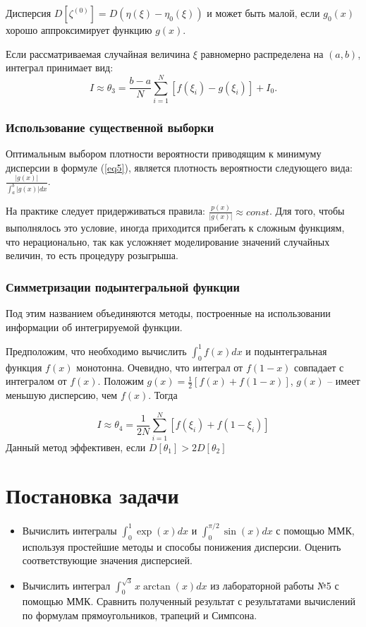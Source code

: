 \documentclass[
11pt,
master, %
subf, %
href, %
colorlinks=true, %
times, %
]{disser}
\begin{document}
Дисперсия $D\left[\zeta^{(0)}\right] = D(\eta(\xi)-\eta_0(\xi))$ и может быть малой, если $g_0(x)$ хорошо аппроксимирует функцию $g(x)$.

Если рассматриваемая случайная величина $\xi$ равномерно распределена на $(a,b)$, интеграл принимает вид:
\begin{equation}\label{eq14}
  I\approx \theta_3 = \frac{b-a}{N}\sum_{i=1}^{N}[f(\xi_i)-g(\xi_i)] + I_0.
\end{equation}

\subsubsection{Использование существенной выборки}
Оптимальным выбором плотности вероятности приводящим к минимуму дисперсии в формуле (\ref{eq5}), является плотность вероятности следующего вида: $\frac{|g(x)|}{\int_{a}^{b}|g(x)|dx}$.

На практике следует придерживаться правила: $\frac{p(x)}{|g(x)|} \approx const$. Для того, чтобы выполнялось это условие, иногда приходится прибегать к сложным функциям, что нерационально, так как усложняет моделирование значений случайных величин, то есть процедуру розыгрыша.

\subsubsection{Симметризации подынтегральной функции}
Под этим названием объединяются методы, построенные на использовании информации об интегрируемой функции.

Предположим, что необходимо вычислить $\int_{0}^{1}f(x)dx$ и подынтегральная функция $f(x)$ монотонна. Очевидно, что интеграл от $f(1-x)$ совпадает с интегралом от $f(x)$. Положим $g(x) = \frac{1}{2}[f(x) + f(1-x)]$, $g(x)$ -- имеет меньшую дисперсию, чем $f(x)$. Тогда

\begin{equation}\label{eq15}
  I\approx \theta_4 = \frac{1}{2N}\sum_{i=1}^{N}[f(\xi_i)+f(1-\xi_i)]
\end{equation}
Данный метод эффективен, если $D[\theta_1] > 2D[\theta_2]$

\newpage
\section{Постановка задачи}
\begin{itemize}
  \item Вычислить интегралы $\displaystyle\int_{0}^{1}\exp(x)dx$ и $\displaystyle\int_{0}^{\pi/2} \sin(x)dx$  с помощью ММК, используя простейшие методы и способы понижения дисперсии. Оценить соответствующие значения дисперсией.
  \item Вычислить интеграл $\displaystyle \int_{0}^{\sqrt{3}} x\arctan(x) dx$ из лабораторной работы №5 с помощью ММК. Сравнить полученный результат с результатами вычислений по формулам прямоугольников, трапеций и Симпсона.
\end{itemize}
\end{document}
